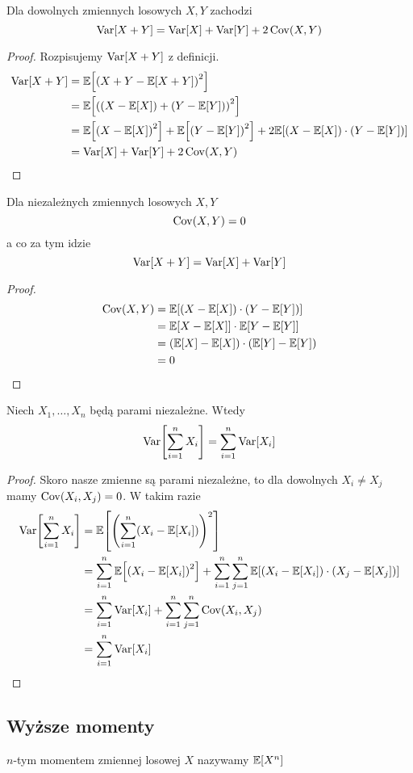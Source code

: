 \begin{theorem}
	Dla dowolnych zmiennych losowych \( X, Y \) zachodzi
	\[
		\variance{X + Y} = \variance{X} + \variance{Y} + 2\covariance{X}{Y}
	\]
\end{theorem}
\begin{proof}
	Rozpisujemy \( \variance{X + Y} \) z definicji.
	\begin{align*}
		\variance{X + Y}
		 & = \expected{\pars{X + Y - \expected{X + Y}}^2}                                \\
		 & = \expected{\pars{\pars{X - \expected{X}} + \pars{Y - \expected{Y}}}^2}       \\
		 & = \expected{\pars{X - \expected{X}}^2} + \expected{\pars{Y - \expected{Y}}^2}
		+ 2\expected{\pars{X - \expected{X}}\cdot\pars{Y - \expected{Y}}}                \\
		 & = \variance{X} + \variance{Y} + 2\covariance{X}{Y}
	\end{align*}
\end{proof}

\begin{theorem} Dla niezależnych zmiennych losowych \( X, Y \)
	\[
		\covariance{X}{Y} = 0
	\]
	a co za tym idzie
	\[
		\variance{X + Y} = \variance{X} + \variance{Y}
	\]
\end{theorem}
\begin{proof}
	\begin{align*}
		\covariance{X}{Y}
		 & = \expected{\pars{X - \expected{X}} \cdot \pars{Y - \expected{Y}}}            \\
		 & = \expected{X - \expected{X}} \cdot \expected{Y - \expected{Y}}               \\
		 & = \pars{\expected{X} - \expected{X}} \cdot \pars{\expected{Y} - \expected{Y}} \\
		 & = 0
	\end{align*}
\end{proof}

\begin{theorem}
	\label{variance-of-sum-of-independent-variables}
	Niech \( X_1, \dots, X_n \) będą parami niezależne. Wtedy
	\[
		\variance{\sum_{i=1}^n X_i} = \sum_{i=1}^n \variance{X_i}
	\]
\end{theorem}
\begin{proof}
	Skoro nasze zmienne są parami niezależne, to dla dowolnych \( X_i \neq X_j \) mamy \( \covariance{X_i}{X_j} = 0 \). W takim razie
	\begin{align*}
		\variance{\sum_{i=1}^n X_i}
		 & = \expected{\pars{\sum_{i=1}^n \pars{X_i - \expected{X_i}}}^2}                                  \\
		 & = \sum_{i=1}^n \expected{\pars{X_i - \expected{X_i}}^2}
		+ \sum_{i=1}^n \sum_{j=1}^n \expected{\pars{X_i - \expected{X_i}}\cdot\pars{X_j - \expected{X_j}}} \\
		 & = \sum_{i=1}^n \variance{X_i} + \sum_{i=1}^n \sum_{j=1}^n \covariance{X_i}{X_j}                 \\
		 & = \sum_{i=1}^n \variance{X_i}
	\end{align*}
\end{proof}


\subsection{Wyższe momenty}
\begin{definition}
	\(n\)-tym momentem zmiennej losowej \( X \) nazywamy \( \expected{X^n} \)
\end{definition}
